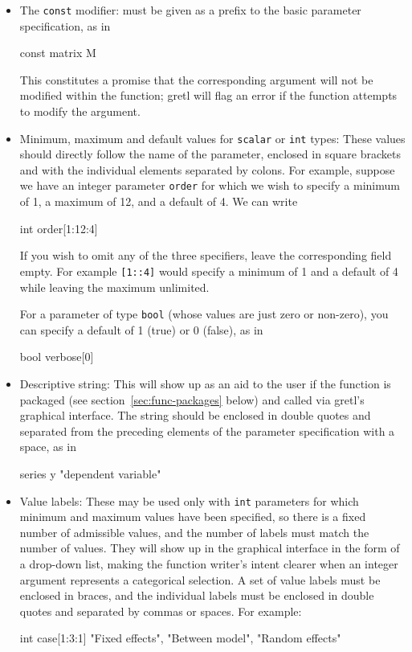 \begin{itemize}

\item The \texttt{const} modifier: must be given as a prefix to the
  basic parameter specification, as in
%    
\begin{code}
const matrix M
\end{code} 
%
This constitutes a promise that the corresponding argument will not be
modified within the function; gretl will flag an error if
the function attempts to modify the argument.

\item Minimum, maximum and default values for \texttt{scalar} or
  \texttt{int} types: These values should directly follow the name of
  the parameter, enclosed in square brackets and with the individual
  elements separated by colons.  For example, suppose we have an
  integer parameter \texttt{order} for which we wish to specify a
  minimum of 1, a maximum of 12, and a default of 4.  We can write
%    
\begin{code}
int order[1:12:4]
\end{code} 
%
If you wish to omit any of the three specifiers, leave the
corresponding field empty.  For example \texttt{[1::4]} would specify
a minimum of 1 and a default of 4 while leaving the maximum
unlimited.  

For a parameter of type \texttt{bool} (whose values are just zero or
non-zero), you can specify a default of 1 (true) or 0 (false), as in
%    
\begin{code}
bool verbose[0]
\end{code} 

\item Descriptive string: This will show up as an aid to the user if
  the function is packaged (see section~\ref{sec:func-packages} below)
  and called via gretl's graphical interface.  The string should
  be enclosed in double quotes and separated from the preceding
  elements of the parameter specification with a space, as in
%
\begin{code}
series y "dependent variable"
\end{code} 

\item Value labels: These may be used only with \texttt{int}
  parameters for which minimum and maximum values have been specified,
  so there is a fixed number of admissible values, and the number of
  labels must match the number of values. They will show up in the
  graphical interface in the form of a drop-down list, making the
  function writer's intent clearer when an integer argument represents
  a categorical selection. A set of value labels must be enclosed in
  braces, and the individual labels must be enclosed in double quotes
  and separated by commas or spaces.  For example:
%
\begin{code}
int case[1:3:1] {"Fixed effects", "Between model", "Random effects"}
\end{code} 

\end{itemize}

